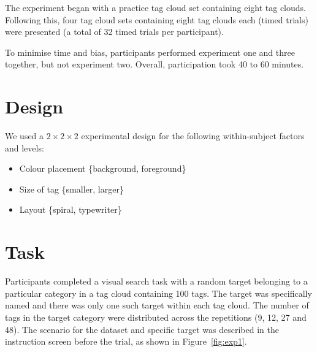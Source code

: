 The experiment began with a practice tag cloud set containing eight tag clouds. Following this, four tag cloud sets containing eight tag clouds each (timed trials) were presented (a total of 32 timed trials per participant).

To minimise time and bias, participants performed experiment one and three together, but not experiment two. Overall, participation took 40 to 60 minutes.

\section{Design}
We used a $2 \times 2 \times 2$ experimental design for the following within-subject factors and levels:

\begin{itemize}
	\item Colour placement \{background, foreground\}
	\item Size of tag \{smaller, larger\}
	\item Layout \{spiral, typewriter\}
\end{itemize}

\section{Task} \label{task}
 
Participants completed a visual search task with a random target belonging to a particular category in a tag cloud containing 100 tags. The target was specifically named and there was only one such target within each tag cloud. The number of tags in the target category were distributed across the repetitions (9, 12, 27 and 48). The scenario for the dataset and specific target was described in the instruction screen before the trial, as shown in Figure~\vref{fig:exp1}. 

